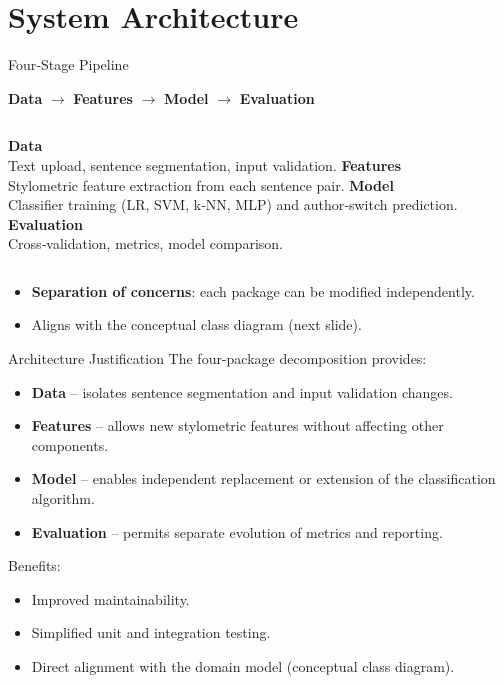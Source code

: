\documentclass[compress,aspectratio=169]{beamer}
\begin{document}
\section{System Architecture}
\begin{frame}{Four‑Stage Pipeline}
    \begin{center}
        \textbf{Data} $\rightarrow$ \textbf{Features} $\rightarrow$ \textbf{Model} $\rightarrow$ \textbf{Evaluation}
    \end{center}
    \begin{columns}[T]
        \textbf{Data}\\
        \footnotesize
        Text upload, sentence segmentation, input validation.
        \textbf{Features}\\
        \footnotesize
        Stylometric feature extraction from each sentence pair.
        \textbf{Model}\\
        \footnotesize
        Classifier training (LR, SVM, k‑NN, MLP) and author‑switch prediction.
        \textbf{Evaluation}\\
        \footnotesize
        Cross‑validation, metrics, model comparison.
    \end{columns}
    \vspace{0.6cm}
    \begin{itemize}
        \item \textbf{Separation of concerns}: each package can be modified independently.
        \item Aligns with the conceptual class diagram (next slide).
    \end{itemize}
\end{frame}

\begin{frame}{Architecture Justification}
    The four-package decomposition provides:
    \begin{itemize}
        \item \textbf{Data} – isolates sentence segmentation and input validation changes.
        \item \textbf{Features} – allows new stylometric features without affecting other components.
        \item \textbf{Model} – enables independent replacement or extension of the classification algorithm.
        \item \textbf{Evaluation} – permits separate evolution of metrics and reporting.
    \end{itemize}
    \vspace{0.4cm}
    Benefits:
    \begin{itemize}
        \item Improved maintainability.
        \item Simplified unit and integration testing.
        \item Direct alignment with the domain model (conceptual class diagram).
    \end{itemize}
\end{frame}
\end{document}
